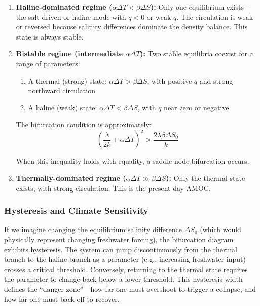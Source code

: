\documentclass[12pt,letterpaper]{article}
\begin{document}
\begin{enumerate}

\item \textbf{Haline-dominated regime ($\alpha\Delta T < \beta\Delta S$):} Only one equilibrium exists---the salt-driven or haline mode with $q < 0$ or weak $q$. The circulation is weak or reversed because salinity differences dominate the density balance. This state is always stable.

\item \textbf{Bistable regime (intermediate $\alpha\Delta T$):} Two stable equilibria coexist for a range of parameters:
  \begin{enumerate}
  \item A thermal (strong) state: $\alpha\Delta T > \beta\Delta S$, with positive $q$ and strong northward circulation
  \item A haline (weak) state: $\alpha\Delta T < \beta\Delta S$, with $q$ near zero or negative
  \end{enumerate}

  The bifurcation condition is approximately:
  \begin{equation}
  \left(\frac{\lambda}{2k} + \alpha\Delta T\right)^2 > \frac{2\lambda\beta\Delta S_0}{k}
  \end{equation}

  When this inequality holds with equality, a saddle-node bifurcation occurs.

\item \textbf{Thermally-dominated regime ($\alpha\Delta T \gg \beta\Delta S$):} Only the thermal state exists, with strong circulation. This is the present-day AMOC.

\end{enumerate}

\subsubsection{Hysteresis and Climate Sensitivity}

If we imagine changing the equilibrium salinity difference $\Delta S_0$ (which would physically represent changing freshwater forcing), the bifurcation diagram exhibits hysteresis. The system can jump discontinuously from the thermal branch to the haline branch as a parameter (e.g., increasing freshwater input) crosses a critical threshold. Conversely, returning to the thermal state requires the parameter to change back below a lower threshold. This hysteresis width defines the ``danger zone''---how far one must overshoot to trigger a collapse, and how far one must back off to recover.
\end{document}
